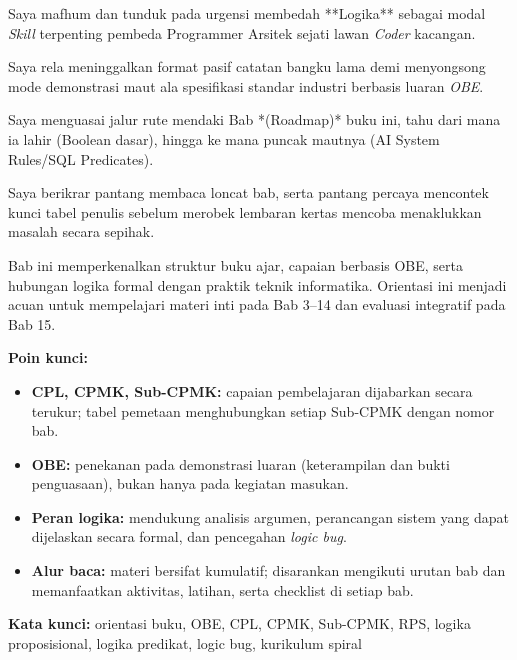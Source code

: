 \documentclass[../main]{subfiles}
\begin{document}
\begin{checklist}
  \item Saya mafhum dan tunduk pada urgensi membedah **Logika** sebagai modal \textit{Skill} terpenting pembeda Programmer Arsitek sejati lawan \textit{Coder} kacangan.
  \item Saya rela meninggalkan format pasif catatan bangku lama demi menyongsong mode demonstrasi maut ala spesifikasi standar industri berbasis luaran \textit{OBE}.
  \item Saya menguasai jalur rute mendaki Bab *(Roadmap)* buku ini, tahu dari mana ia lahir (Boolean dasar), hingga ke mana puncak mautnya (AI System Rules/SQL Predicates).
  \item Saya berikrar pantang membaca loncat bab, serta pantang percaya mencontek kunci tabel penulis sebelum merobek lembaran kertas mencoba menaklukkan masalah secara sepihak.
\end{checklist}

\begin{rangkuman}
Bab ini memperkenalkan struktur buku ajar, capaian berbasis OBE, serta hubungan logika formal dengan praktik teknik informatika. Orientasi ini menjadi acuan untuk mempelajari materi inti pada Bab 3--14 dan evaluasi integratif pada Bab 15.

\textbf{Poin kunci:}
\begin{itemize}
  \item \textbf{CPL, CPMK, Sub-CPMK:} capaian pembelajaran dijabarkan secara terukur; tabel pemetaan menghubungkan setiap Sub-CPMK dengan nomor bab.
  \item \textbf{OBE:} penekanan pada demonstrasi luaran (keterampilan dan bukti penguasaan), bukan hanya pada kegiatan masukan.
  \item \textbf{Peran logika:} mendukung analisis argumen, perancangan sistem yang dapat dijelaskan secara formal, dan pencegahan \textit{logic bug}.
  \item \textbf{Alur baca:} materi bersifat kumulatif; disarankan mengikuti urutan bab dan memanfaatkan aktivitas, latihan, serta checklist di setiap bab.
\end{itemize}

\textbf{Kata kunci:} orientasi buku, OBE, CPL, CPMK, Sub-CPMK, RPS, logika proposisional, logika predikat, logic bug, kurikulum spiral
\end{rangkuman}

\ifSubfilesClassLoaded{
  \renewcommand{\bibname}{Daftar Pustaka}
  
  
}{}
\end{document}
